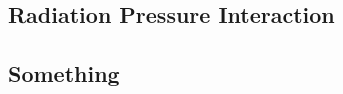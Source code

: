 \documentclass[main.tex]{subfiles}
\begin{document}
\subsection{Radiation Pressure Interaction}

\subsection{Something}
\end{document}
